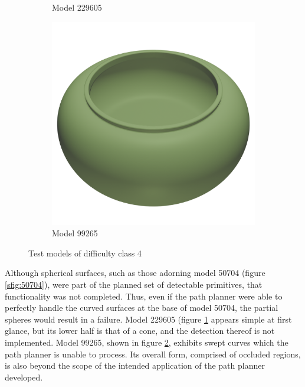 \begin{figure}[htb]
\begin{subfigure}{0.3\textwidth}
	\caption{Model 229605}
	\label{sfig:229605}
\end{subfigure}
\hfill
\begin{subfigure}{0.3\textwidth}
	\includegraphics[width=\textwidth]{../resources/models/99265.png}
	\caption{Model 99265}
	\label{sfig:99265}
\end{subfigure}
\caption{Test models of difficulty class 4}
\label{fig:class_4_models}
\end{figure}

Although spherical surfaces, such as those adorning model 50704 (figure \ref{sfig:50704}), were part of the planned set of detectable primitives, that functionality was not completed.
Thus, even if the path planner were able to perfectly handle the curved surfaces at the base of model 50704, the partial spheres would result in a failure.
Model 229605 (figure \ref{sfig:229605} appears simple at first glance, but its lower half is that of a cone, and the detection thereof is not implemented.
Model 99265, shown in figure \ref{sfig:99265}, exhibits swept curves which the path planner is unable to process.
Its overall form, comprised of occluded regions, is also beyond the scope of the intended application of the path planner developed.

